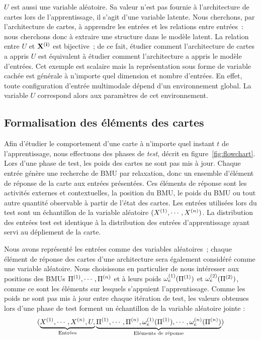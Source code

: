 \documentclass[../main]{subfiles}
\begin{document}
$U$ est aussi une variable aléatoire. Sa valeur n'est pas fournie à l'architecture de cartes lors de l'apprentissage, il s'agit d'une variable latente.
Nous cherchons, par l'architecture de cartes, à apprendre les entrées et les relations entre entrées~: nous cherchons donc à extraire une structure dans le modèle latent. La relation entre $U$ et $\mathbf{X^{({i})}}$ est bijective~; de ce fait, étudier comment l'architecture de cartes a appris $U$ est équivalent à étudier comment l'architecture a appris le modèle d'entrées.
Cet exemple est scalaire mais la représentation sous forme de variable cachée est générale à n'importe quel dimension et nombre d'entrées. 
En effet, toute configuration d'entrée multimodale dépend d'un environnement global. La variable $U$ correspond alors aux paramètres de cet environnement.

\subsection{Formalisation des éléments des cartes}

Afin d'étudier le comportement d'une carte à n'importe quel instant $t$ de l'apprentissage, nous effectuons des phases de \emph{test}, décrit en figure~\ref{fig:flowchart}.
Lors d'une phase de test, les poids des cartes ne sont pas mis à jour. Chaque entrée génère une recherche de BMU par relaxation, donc un ensemble d'élément de réponse de la carte aux entrées présentées. Ces éléments de réponse sont les activités externes et contextuelles, la position du BMU, le poids du BMU ou tout autre quantité observable à partir de l'état des cartes.
Les entrées utilisées lors du test sont un échantillon de la variable aléatoire $(X^{({1})}, \cdots, X^{({n})})$.
La distribution des entrées test est identique à la distribution des entrées d'apprentissage ayant servi au dépliement de la carte.

Nous avons représenté les entrées comme des variables aléatoires~; chaque élément de réponse des cartes d'une architecture sera également considéré comme une variable aléatoire.
Nous choisissons en particulier de nous intéresser aux positions des BMUs $\Pi^{({1})}, \cdots, \Pi^{({n})}$ et à leurs poids $\omega_{e}^{({1})}(\Pi^{({1})})$ et $\omega_{e}^{({2})}(\Pi^{({2})})$, comme ce sont les éléments sur lesquels s'appuient l'apprentissage.
Comme les poids ne sont pas mis à jour entre chaque itération de test, les valeurs obtenues lors d'une phase de test forment un échantillon de la variable aléatoire jointe :
$$(\underbrace{X^{({1})}, \cdots, X^{({n})}, U,}_{\text{Entrées}} \underbrace{\Pi^{({1})}, \cdots, \Pi^{({n})}, \omega_e^{({1})}(\Pi^{({1})}), \cdots, \omega_e^{({n})}(\Pi^{({n})})}_{\text{Eléments de réponse}})$$
\end{document}
